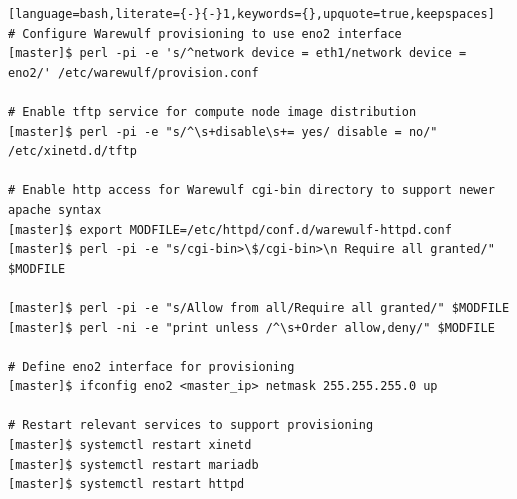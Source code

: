 \documentclass[letterpaper]{article}
\begin{document}
\begin{lstlisting}[language=bash,literate={-}{-}1,keywords={},upquote=true,keepspaces]
# Configure Warewulf provisioning to use eno2 interface
[master]$ perl -pi -e 's/^network device = eth1/network device = eno2/' /etc/warewulf/provision.conf

# Enable tftp service for compute node image distribution
[master]$ perl -pi -e "s/^\s+disable\s+= yes/ disable = no/" /etc/xinetd.d/tftp

# Enable http access for Warewulf cgi-bin directory to support newer apache syntax
[master]$ export MODFILE=/etc/httpd/conf.d/warewulf-httpd.conf
[master]$ perl -pi -e "s/cgi-bin>\$/cgi-bin>\n Require all granted/" $MODFILE

[master]$ perl -pi -e "s/Allow from all/Require all granted/" $MODFILE
[master]$ perl -ni -e "print unless /^\s+Order allow,deny/" $MODFILE

# Define eno2 interface for provisioning
[master]$ ifconfig eno2 <master_ip> netmask 255.255.255.0 up

# Restart relevant services to support provisioning
[master]$ systemctl restart xinetd  
[master]$ systemctl restart mariadb 
[master]$ systemctl restart httpd   
\end{lstlisting}


\end{document}

